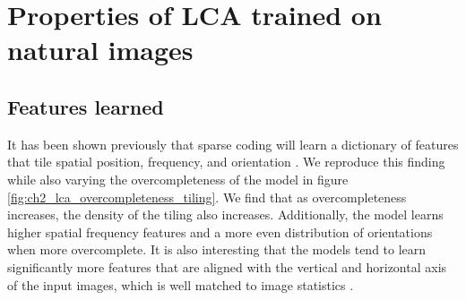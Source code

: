 \section{Properties of LCA trained on natural images}\label{sec:ch2_lca_properties}
\subsection{Features learned}
It has been shown previously that sparse coding will learn a dictionary of features that tile spatial position, frequency, and orientation \parencite{olshausen1996emergence, olshausen1997sparse}. We reproduce this finding while also varying the overcompleteness of the model in figure \ref{fig:ch2_lca_overcompleteness_tiling}. We find that as overcompleteness increases, the density of the tiling also increases. Additionally, the model learns higher spatial frequency features and a more even distribution of orientations when more overcomplete. It is also interesting that the models tend to learn significantly more features that are aligned with the vertical and horizontal axis of the input images, which is well matched to image statistics \parencite{switkes1978spatial, torralba2003statistics}.

